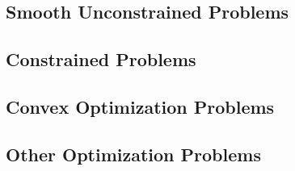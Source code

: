 


\subsection{Smooth Unconstrained Problems}


\subsection{Constrained Problems}


\subsection{Convex Optimization Problems}


\subsection{Other Optimization Problems}

